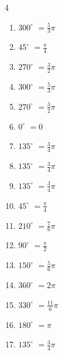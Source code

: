 \begin{multicols}{4}
\begin{enumerate}
  \item $\displaystyle 300^{\circ}$
        $\displaystyle =\frac{5}{3}\pi$

  \item $\displaystyle 45^{\circ}$
        $\displaystyle =\frac{\pi}{4}$

  \item $\displaystyle 270^{\circ}$
        $\displaystyle =\frac{3}{2}\pi$

  \item $\displaystyle 300^{\circ}$
        $\displaystyle =\frac{5}{3}\pi$

  \item $\displaystyle 270^{\circ}$
        $\displaystyle =\frac{3}{2}\pi$

  \item $\displaystyle 0^{\circ}$
        $\displaystyle =0$

  \item $\displaystyle 135^{\circ}$
        $\displaystyle =\frac{3}{4}\pi$

  \item $\displaystyle 135^{\circ}$
        $\displaystyle =\frac{3}{4}\pi$

  \item $\displaystyle 135^{\circ}$
        $\displaystyle =\frac{3}{4}\pi$

  \item $\displaystyle 45^{\circ}$
        $\displaystyle =\frac{\pi}{4}$

  \item $\displaystyle 210^{\circ}$
        $\displaystyle =\frac{7}{6}\pi$

\columnbreak %

  \item $\displaystyle 90^{\circ}$
        $\displaystyle =\frac{\pi}{2}$

  \item $\displaystyle 150^{\circ}$
        $\displaystyle =\frac{5}{6}\pi$

  \item $\displaystyle 360^{\circ}$
        $\displaystyle =2\pi$

  \item $\displaystyle 330^{\circ}$
        $\displaystyle =\frac{11}{6}\pi$

  \item $\displaystyle 180^{\circ}$
        $\displaystyle =\pi$

  \item $\displaystyle 135^{\circ}$
        $\displaystyle =\frac{3}{4}\pi$


\end{enumerate}
\end{multicols}
